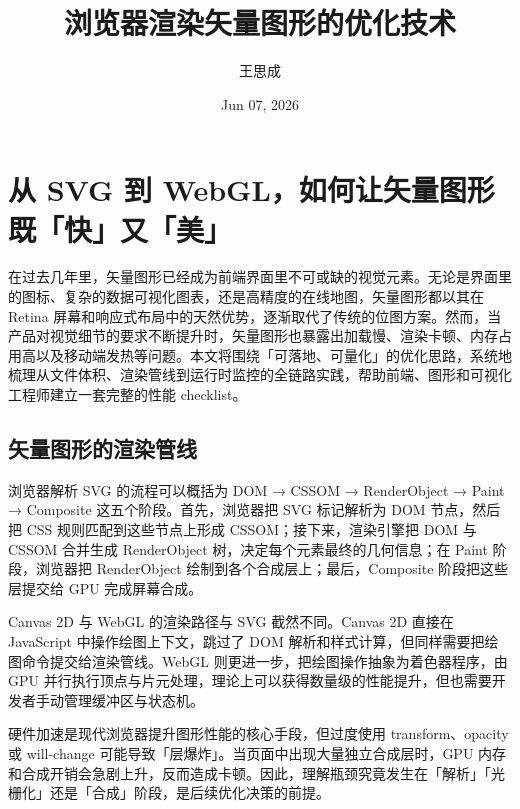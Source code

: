 \title{浏览器渲染矢量图形的优化技术}
\author{王思成}
\date{Jun 07, 2026}
\maketitle
\chapter{从 SVG 到 WebGL，如何让矢量图形既「快」又「美」}
在过去几年里，矢量图形已经成为前端界面里不可或缺的视觉元素。无论是界面里的图标、复杂的数据可视化图表，还是高精度的在线地图，矢量图形都以其在 Retina 屏幕和响应式布局中的天然优势，逐渐取代了传统的位图方案。然而，当产品对视觉细节的要求不断提升时，矢量图形也暴露出加载慢、渲染卡顿、内存占用高以及移动端发热等问题。本文将围绕「可落地、可量化」的优化思路，系统地梳理从文件体积、渲染管线到运行时监控的全链路实践，帮助前端、图形和可视化工程师建立一套完整的性能 checklist。\par
\section{矢量图形的渲染管线}
浏览器解析 SVG 的流程可以概括为 DOM → CSSOM → RenderObject → Paint → Composite 这五个阶段。首先，浏览器把 SVG 标记解析为 DOM 节点，然后把 CSS 规则匹配到这些节点上形成 CSSOM；接下来，渲染引擎把 DOM 与 CSSOM 合并生成 RenderObject 树，决定每个元素最终的几何信息；在 Paint 阶段，浏览器把 RenderObject 绘制到各个合成层上；最后，Composite 阶段把这些层提交给 GPU 完成屏幕合成。\par
Canvas 2D 与 WebGL 的渲染路径与 SVG 截然不同。Canvas 2D 直接在 JavaScript 中操作绘图上下文，跳过了 DOM 解析和样式计算，但同样需要把绘图命令提交给渲染管线。WebGL 则更进一步，把绘图操作抽象为着色器程序，由 GPU 并行执行顶点与片元处理，理论上可以获得数量级的性能提升，但也需要开发者手动管理缓冲区与状态机。\par
硬件加速是现代浏览器提升图形性能的核心手段，但过度使用 transform、opacity 或 will-change 可能导致「层爆炸」。当页面中出现大量独立合成层时，GPU 内存和合成开销会急剧上升，反而造成卡顿。因此，理解瓶颈究竟发生在「解析」「光栅化」还是「合成」阶段，是后续优化决策的前提。\par
